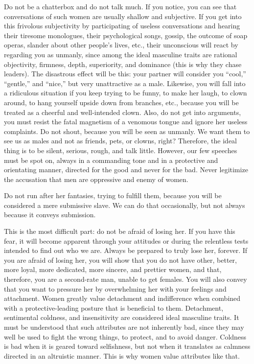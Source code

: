 \par Do not be a chatterbox and do not talk much. If you notice, you can see that conversations of such women are usually shallow and subjective. If you get into this frivolous subjectivity by participating of useless conversations and hearing their tiresome monologues, their psychological songs, gossip, the outcome of soap operas, slander about other people's lives, etc., their unconscious will react by regarding you as unmanly, since among the ideal masculine traits are rational objectivity, firmness, depth, superiority, and dominance (this is why they chase leaders). The disastrous effect will be this: your partner will consider you \enquote{cool,} \enquote{gentle,} and \enquote{nice,} but very unattractive as a male. Likewise, you will fall into a ridiculous situation if you keep trying to be funny, to make her laugh, to clown around, to hang yourself upside down from branches, etc., because you will be treated as a cheerful and well-intended clown. Also, do not get into arguments, you must resist the fatal magnetism of a venomous tongue and ignore her useless complaints. Do not shout, because you will be seen as unmanly. We want them to see us as males and not as friends, pets, or clowns, right? Therefore, the ideal thing is to be silent, serious, rough, and talk little. However, our few speeches must be spot on, always in a commanding tone and in a protective and orientating manner, directed for the good and never for the bad. Never legitimize the accusation that men are oppressive and enemy of women.

\par Do not run after her fantasies, trying to fulfill them, because you will be considered a mere submissive slave. We can do that occasionally, but not always because it conveys submission.

\par This is the most difficult part: do not be afraid of losing her. If you have this fear, it will become apparent through your attitudes or during the relentless tests intended to find out who we are. Always be prepared to truly lose her, forever. If you are afraid of losing her, you will show that you do not have other, better, more loyal, more dedicated, more sincere, and prettier women, and that, therefore, you are a second-rate man, unable to get females. You will also convey that you want to pressure her by overwhelming her with your feelings and attachment. Women greatly value detachment and indifference when combined with a protective-leading posture that is beneficial to them. Detachment, sentimental coldness, and insensitivity are considered ideal masculine traits. It must be understood that such attributes are not inherently bad, since they may well be used to fight the wrong things, to protect, and to avoid danger. Coldness is bad when it is geared toward selfishness, but not when it translates as calmness directed in an altruistic manner. This is why women value attributes like that.

